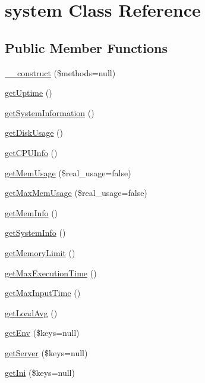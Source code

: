 \hypertarget{classsystem}{\section{system Class Reference}
\label{classsystem}
}
\subsection*{Public Member Functions}
\begin{DoxyCompactItemize}
\item 
\hyperlink{classsystem_a3c2c97b7c3cc17e9ab8a94d8e96bbd27}{\-\_\-\-\_\-construct} (\$methods=null)
\item 
\hyperlink{classsystem_a729fd496363f1c2268ad9545d018dc9a}{get\-Uptime} ()
\item 
\hyperlink{classsystem_a74226cae1db80f3ba35dfb493cc5fbf0}{get\-System\-Information} ()
\item 
\hyperlink{classsystem_a08ed211a8a23f1a03ec811af6c382230}{get\-Disk\-Usage} ()
\item 
\hyperlink{classsystem_a7d9bc523c374100cc51933bef6794dc0}{get\-C\-P\-U\-Info} ()
\item 
\hyperlink{classsystem_a6e8d20186fa65a7f119b7b0241cf2820}{get\-Mem\-Usage} (\$real\-\_\-usage=false)
\item 
\hyperlink{classsystem_a3eee54f787a78c3eda3578ee025d80df}{get\-Max\-Mem\-Usage} (\$real\-\_\-usage=false)
\item 
\hyperlink{classsystem_a0089758f0aa070c946b31c52914f4c81}{get\-Mem\-Info} ()
\item 
\hyperlink{classsystem_a4dfeda78ac1fdb804ec9b0a6f87213b9}{get\-System\-Info} ()
\item 
\hyperlink{classsystem_a15634c4aad1694e7d36baa492586e6c2}{get\-Memory\-Limit} ()
\item 
\hyperlink{classsystem_a8a117529f0a1a001e08dc68e914744ea}{get\-Max\-Execution\-Time} ()
\item 
\hyperlink{classsystem_a14e2098a8d134b186256094753a52ab9}{get\-Max\-Input\-Time} ()
\item 
\hyperlink{classsystem_a48cc4a096368bbfa266cc77dda84f479}{get\-Load\-Avg} ()
\item 
\hyperlink{classsystem_ace8bd36ac18cc88693b3c64bf7a7aa9f}{get\-Env} (\$keys=null)
\item 
\hyperlink{classsystem_acf57c35e0a0384e6a44d12986cc7688a}{get\-Server} (\$keys=null)
\item 
\hyperlink{classsystem_ada40f22e649062bd702e850a110ba9f4}{get\-Ini} (\$keys=null)
\end{DoxyCompactItemize}
